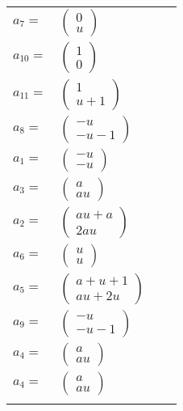 \documentclass[1p]{elsarticle_modified}
\theoremstyle{definition}
\begin{document}
\begin{tabular}{m{7pt} m{180pt} m{7pt} m{180pt} }
\flushright $a_{7}=$&$\begin{pmatrix}0\\u\end{pmatrix}$ \\
\flushright $a_{10}=$&$\begin{pmatrix}1\\0\end{pmatrix}$ \\
\flushright $a_{11}=$&$\begin{pmatrix}1\\u+1\end{pmatrix}$ \\
\flushright $a_{8}=$&$\begin{pmatrix}- u\\- u-1\end{pmatrix}$ \\
\flushright $a_{1}=$&$\begin{pmatrix}- u\\- u\end{pmatrix}$ \\
\flushright $a_{3}=$&$\begin{pmatrix}a\\a u\end{pmatrix}$ \\
\flushright $a_{2}=$&$\begin{pmatrix}a u+a\\2 a u\end{pmatrix}$ \\
\flushright $a_{6}=$&$\begin{pmatrix}u\\u\end{pmatrix}$ \\
\flushright $a_{5}=$&$\begin{pmatrix}a+u+1\\a u+2 u\end{pmatrix}$ \\
\flushright $a_{9}=$&$\begin{pmatrix}- u\\- u-1\end{pmatrix}$ \\
\flushright $a_{4}=$&$\begin{pmatrix}a\\a u\end{pmatrix}$\\ \flushright $a_{4}=$&$\begin{pmatrix}a\\a u\end{pmatrix}$\\&\end{tabular}
\end{document}
